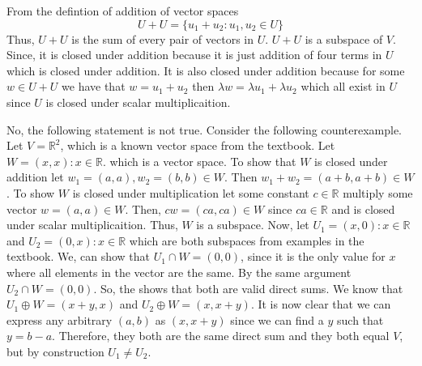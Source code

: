\documentclass[10pt, twocolumn]{article}
\newcommand{\R}{\mathbb{R}}
\begin{document}
\begin{q}[Problem 15]
    From the defintion of addition of vector spaces 
    $$ U + U = \{u_1 + u_2 : u_1, u_2 \in U\}  $$
    Thus, $ U+ U $ is the sum of every pair of vectors in $ U $. 
    $ U + U $ is a subspace of $ V $. Since, it is closed under addition because it is just addition of four terms in $ U $ which is closed under addition. 
    It is also closed under addition because for some $ w \in U + U $ we have that $ w = u_1 + u_2 $ then $ \lambda w = \lambda u_1 + \lambda u_2 $ which all exist in $ U $ since $ U $ is closed under scalar multiplicaition.
\end{q}
\begin{q}[Problem 23]
    No, the following statement is not true. 
    Consider the following counterexample. 
    Let $ V = \R^2 $, which is a known vector space from the textbook.  
    Let $ W = {(x, x): x \in \R }. $ which is a vector space. 
    To show that $ W $ is closed under addition let $ w_1 = (a, a), w_2 = (b, b) \in W $. 
    Then $ w_1 + w_2 = (a+b, a+b) \in W $. 
    To show $ W $ is closed under multiplication let some constant $ c \in \R $ multiply some vector $ w = (a, a) \in W $. 
    Then, $ cw = (ca, ca) \in W $ since $ ca \in \R $ and is closed under scalar multiplicaition. 
    Thus, $ W $ is a subspace. 
    Now, let $ U_1 = {(x, 0) : x \in \R } $ and $ U_2 = {(0, x) : x \in \R } $ which are both subspaces from examples in the textbook.
    We, can show that $ U_1 \cap W = {(0, 0)} $, since it is the only value for $ x $ where all elements in the vector are the same. 
    By the same argument $ U_2 \cap W = {(0, 0)} $. 
    So, the shows that both are valid direct sums. 
    We know that $ U_1 \oplus W = (x+y, x) $ and $ U_2 \oplus W = (x, x+y) $. 
    It is now clear that we can express any arbitrary $ (a, b) $ as $ (x, x+y) $ since we can find a $ y $ such that $ y = b - a $. 
    Therefore, they both are the same direct sum and they both equal $ V $, but by construction $ U_1 \neq U_2 $. 
\end{q}
\end{document}
